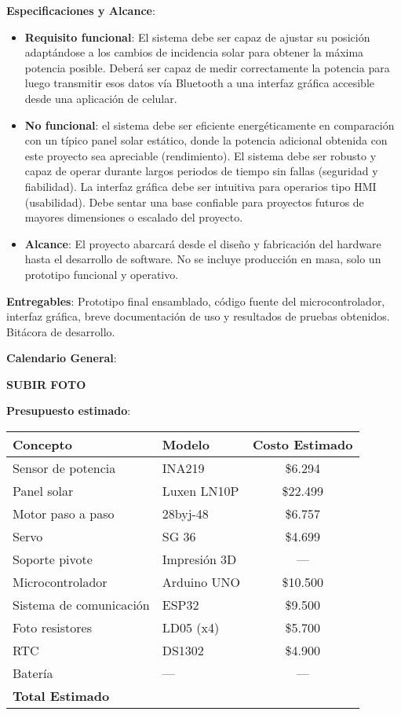 \documentclass[a4paper,12pt]{article}
\begin{document}
\textbf{Especificaciones y Alcance}:
\begin{itemize}
    \item \textbf{Requisito funcional}: El sistema debe ser capaz de ajustar su posición adaptándose a los cambios de incidencia solar para obtener la máxima potencia posible. Deberá ser capaz de medir correctamente la potencia para luego transmitir esos datos vía Bluetooth a una interfaz gráfica accesible desde una aplicación de celular.
    \item \textbf{No funcional}: el sistema debe ser eficiente energéticamente en comparación con un típico panel solar estático, donde la potencia adicional obtenida con este proyecto sea apreciable (rendimiento). El sistema debe ser robusto y capaz de operar durante largos periodos de tiempo sin fallas (seguridad y fiabilidad). La interfaz gráfica debe ser intuitiva para operarios tipo HMI (usabilidad). Debe sentar una base confiable para proyectos futuros de mayores dimensiones o escalado del proyecto.
    \item \textbf{Alcance}: El proyecto abarcará desde el diseño y fabricación del hardware hasta el desarrollo de software. No se incluye producción en masa, solo un prototipo funcional y operativo.
\end{itemize}

\textbf{Entregables}: 
Prototipo final ensamblado, código fuente del microcontrolador, interfaz gráfica, breve documentación de uso y resultados de pruebas obtenidos. Bitácora de desarrollo.

\textbf{Calendario General}: 
\begin{center}
\textbf{SUBIR FOTO}
\end{center}

\textbf{Presupuesto estimado}:

\begin{table}[h]
    \centering
    \begin{tabular}{|l|l|c|}
        \hline
        Concepto & Modelo & Costo Estimado \\ 
        \hline
        Sensor de potencia & INA219 & \$6.294 \\
        Panel solar & Luxen LN10P & \$22.499 \\
        Motor paso a paso & 28byj-48 & \$6.757 \\
        Servo & SG 36 & \$4.699 \\
        Soporte pivote & Impresión 3D & --- \\
        Microcontrolador & Arduino UNO & \$10.500 \\
        Sistema de comunicación & ESP32 & \$9.500 \\
        Foto resistores & LD05 (x4) & \$5.700 \\
        RTC & DS1302 & \$4.900 \\
        Batería & --- & --- \\
        \hline
        \textbf{Total Estimado} & & \\
        \hline
    \end{tabular}
\end{table}
\end{document}
